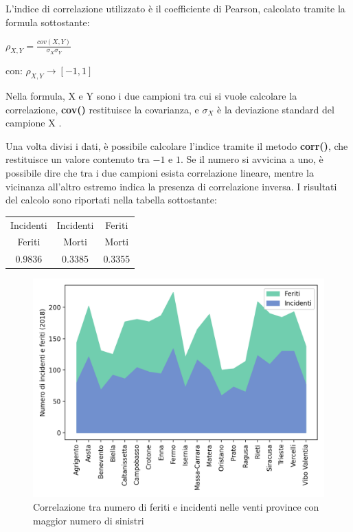 \documentclass[a4paper,12pt]{report}
\newcommand{\methodstyle}[1]{\textbf{#1}}
\begin{document}
L'indice di correlazione utilizzato è il coefficiente di Pearson, 
calcolato tramite la formula sottostante: 

\begin{center}
    $\rho_{X, Y} = \displaystyle \frac{cov(X, Y)}{\sigma_X \sigma_Y}$
\end{center}

\begin{center}
    con: $\rho_{X, Y} \rightarrow [-1, 1]$
\end{center}

Nella formula, X e Y sono i due campioni tra cui si vuole calcolare la correlazione, 
\methodstyle{cov()} restituisce la covarianza, e $\sigma_X$ è la deviazione standard del 
campione X \cite{PROB_E_STATISTICA:3}. 

Una volta divisi i dati, è possibile calcolare l'indice tramite il metodo 
\methodstyle{corr()}, che restituisce un valore contenuto tra $-1$ e $1$. 
Se il numero si avvicina a uno, è possibile dire che tra i due campioni esista correlazione 
lineare, mentre la vicinanza all'altro estremo indica la presenza di correlazione inversa.
I risultati del calcolo sono riportati nella tabella sottostante: 

\begin{center}
    \def\arraystretch{1.5}%
    \begin{tabular}{ |c|c|c| } 
    \hline
    Incidenti & Incidenti & Feriti \\ 
    Feriti & Morti & Morti \\ 
    \hline
    0.9836 & 0.3385 & 0.3355 \\ 
    \hline
    \end{tabular}
\end{center}

\begin{figure}
    \includegraphics[width=\linewidth]{../src/incidenti/incidenti_aci/provincia/corr_incidenti.png}
    \caption{Correlazione tra numero di feriti e incidenti nelle venti province con maggior numero di sinistri}
    \label{fig:corr-incidenti-feriti}
\end{figure}
\end{document}

